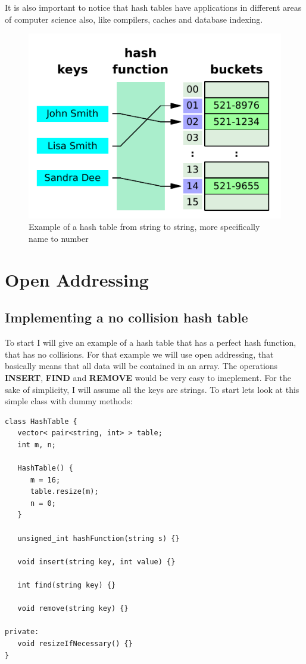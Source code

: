 It is also important to notice that hash tables have applications in different areas of computer science also, like compilers, caches and database indexing.


\begin{figure}[h!]
  \centering
  \includegraphics[width=12cm]{figuras/hash-table.pdf}
  \caption{Example of a hash table from string to string, more specifically name to number}
\end{figure}


\section{Open Addressing}

\subsection{Implementing a no collision hash table}

To start I will give an example of a hash table that has a perfect hash function, that has no collisions. For that example we will use open addressing, that basically means that all data will be contained in an array. The operations \textbf{INSERT}, \textbf{FIND} and \textbf{REMOVE} would be very easy to imeplement. For the sake of simplicity, I will assume all the keys are strings. To start lets look at this simple class with dummy methods:

\begin{lstlisting}
class HashTable {
   vector< pair<string, int> > table;
   int m, n;
   
   HashTable() {
      m = 16;
      table.resize(m);
      n = 0;
   }

   unsigned_int hashFunction(string s) {}
   
   void insert(string key, int value) {}

   int find(string key) {}

   void remove(string key) {}

private:
   void resizeIfNecessary() {}
}
\end{lstlisting}

